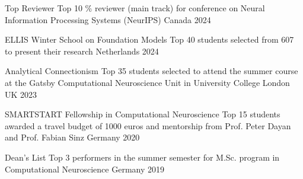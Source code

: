 



\begin{cvhonors}


    \cvhonor
    {Top Reviewer} %
    {Top 10 \% reviewer (main track) for conference on Neural Information Processing Systems (NeurIPS)} %
    {Canada} %
    {2024} %

    
    \cvhonor
    {ELLIS Winter School on Foundation Models} %
    {Top 40 students selected from 607 to present their research} %
    {Netherlands} %
    {2024} %
    
    \cvhonor
    {Analytical Connectionism} %
    {Top 35 students selected to attend the summer course at the Gatsby Computational Neuroscience Unit in University College London} %
    {UK} %
    {2023} %

    
    \cvhonor
    {SMARTSTART Fellowship in Computational Neuroscience} %
    {Top 15 students awarded a travel budget of 1000 euros and mentorship from Prof. Peter Dayan and Prof. Fabian Sinz} %
    {Germany} %
    {2020} %
    
  \cvhonor
    {Dean's List} %
    {Top 3 performers in the summer semester for M.Sc. program in Computational Neuroscience} %
    {Germany} %
    {2019} %


\end{cvhonors}
